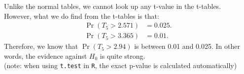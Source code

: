 \documentclass[12pt]{article}
\begin{document}
{\begin{minipage}[t]{0.98\textwidth}
\begin{minipage}[t]{0.47\textwidth}
\begin{enumerate}
    Unlike the normal tables, we cannot look up any t-value in the t-tables.\\[0.3cm]
    However, what we do find from the t-tables is that:
    \begin{align*}
    \Pr(T_5 > 2.571) &= 0.025. \\[0.2cm]
    \Pr(T_5 > 3.365) &= 0.01.
    \end{align*}
    Therefore, we know that $\Pr(T_5 > 2.94)$ is between 0.01 and 0.025. In other words, the evidence against $H_0$ is quite strong.\\[0.3cm]
    {\footnotesize(note: when using \texttt{t.test} in \texttt{R}, the exact p-value is calculated automatically)}
\end{enumerate}
\end{minipage}
\end{minipage}}\vspace{0.03\textwidth}
\end{document}
